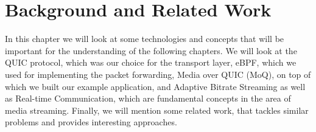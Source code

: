 
\chapter{Background and Related Work}\label{chap:background}

In this chapter we will look at some technologies and concepts 
that will be important for the understanding of the following chapters.
We will look at the QUIC protocol, which was our choice for the 
transport layer, eBPF, which we used for implementing the packet 
forwarding, Media over QUIC (MoQ), on top of which we built 
our example application, and Adaptive Bitrate Streaming as well as 
Real-time Communication, which are fundamental concepts in the area 
of media streaming.
Finally, we will mention some related work, that tackles similar 
problems and provides interesting approaches.  






